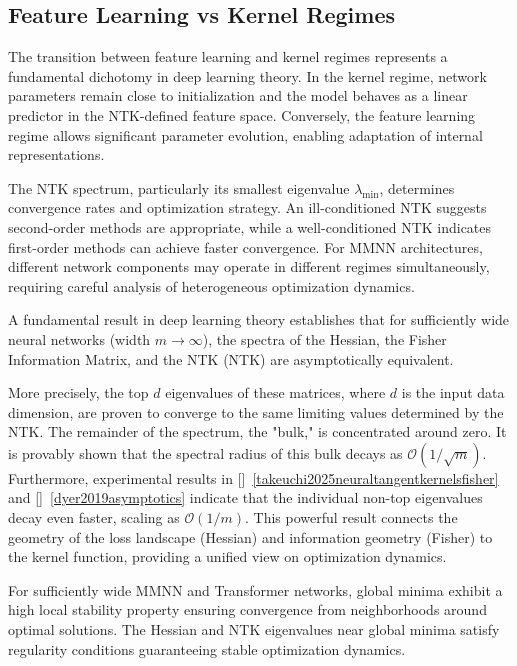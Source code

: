 \documentclass[a4paper]{article}
\theoremstyle{plain}
\theoremstyle{definition}
\theoremstyle{remark}
\begin{document}
\subsection{Feature Learning vs Kernel Regimes}

The transition between feature learning and kernel regimes represents a fundamental dichotomy in deep learning theory. In the kernel regime, network parameters remain close to initialization and the model behaves as a linear predictor in the NTK-defined feature space. Conversely, the feature learning regime allows significant parameter evolution, enabling adaptation of internal representations.

The NTK spectrum, particularly its smallest eigenvalue $\lambda_{\min}$, determines convergence rates and optimization strategy. An ill-conditioned NTK suggests second-order methods are appropriate, while a well-conditioned NTK indicates first-order methods can achieve faster convergence. For MMNN architectures, different network components may operate in different regimes simultaneously, requiring careful analysis of heterogeneous optimization dynamics.

\begin{tcolorbox}[colback=red!5,colframe=red!80!black,title={\textbf{Theorem: Spectral Equivalence of NTK, Hessian, and Fisher Matrix}},enhanced,drop shadow,boxrule=2pt]
A fundamental result in deep learning theory establishes that for sufficiently wide neural networks (width $m \to \infty$), the spectra of the Hessian, the Fisher Information Matrix, and the NTK (NTK) are asymptotically equivalent.

More precisely, the top $d$ eigenvalues of these matrices, where $d$ is the input data dimension, are proven to converge to the same limiting values determined by the NTK. The remainder of the spectrum, the "bulk," is concentrated around zero. It is provably shown that the spectral radius of this bulk decays as $\mathcal{O}(1/\sqrt{m})$. Furthermore, experimental results in []~\ref{takeuchi2025neuraltangentkernelsfisher} and []~\ref{dyer2019asymptotics} indicate that the individual non-top eigenvalues decay even faster, scaling as $\mathcal{O}(1/m)$. This powerful result connects the geometry of the loss landscape (Hessian) and information geometry (Fisher) to the kernel function, providing a unified view on optimization dynamics.
\end{tcolorbox}


\begin{tcolorbox}[colback=green!15,colframe=green!80!black,title={\textbf{Conjecture from Pr Haizhao Yang: Global Minima Stability}},enhanced,drop shadow,boxrule=2pt]
For sufficiently wide MMNN and Transformer networks, global minima exhibit a high local stability property ensuring convergence from neighborhoods around optimal solutions. The Hessian and NTK eigenvalues near global minima satisfy regularity conditions guaranteeing stable optimization dynamics.
\end{tcolorbox}
\end{document}
